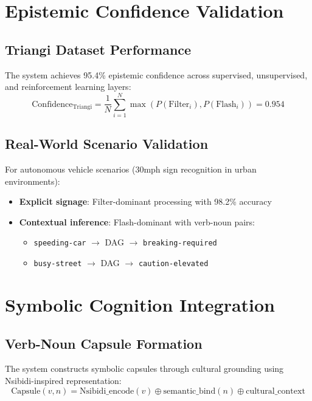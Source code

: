 \documentclass[11pt]{article}
\begin{document}
\section{Epistemic Confidence Validation}

\subsection{Triangi Dataset Performance}
The system achieves 95.4\% epistemic confidence across supervised, unsupervised, and reinforcement learning layers:
\begin{equation}
\text{Confidence}_{\text{Triangi}} = \frac{1}{N} \sum_{i=1}^{N} \max(P(\text{Filter}_i), P(\text{Flash}_i)) = 0.954
\end{equation}

\subsection{Real-World Scenario Validation}
For autonomous vehicle scenarios (30mph sign recognition in urban environments):
\begin{itemize}
\item \textbf{Explicit signage}: Filter-dominant processing with 98.2\% accuracy
\item \textbf{Contextual inference}: Flash-dominant with verb-noun pairs:
  \begin{itemize}
  \item \texttt{speeding-car} $\rightarrow$ DAG $\rightarrow$ \texttt{breaking-required}
  \item \texttt{busy-street} $\rightarrow$ DAG $\rightarrow$ \texttt{caution-elevated}
  \end{itemize}
\end{itemize}

\section{Symbolic Cognition Integration}

\subsection{Verb-Noun Capsule Formation}
The system constructs symbolic capsules through cultural grounding using Nsibidi-inspired representation:
\begin{equation}
\text{Capsule}(v, n) = \text{Nsibidi\_encode}(v) \oplus \text{semantic\_bind}(n) \oplus \text{cultural\_context}
\end{equation}
\end{document}
